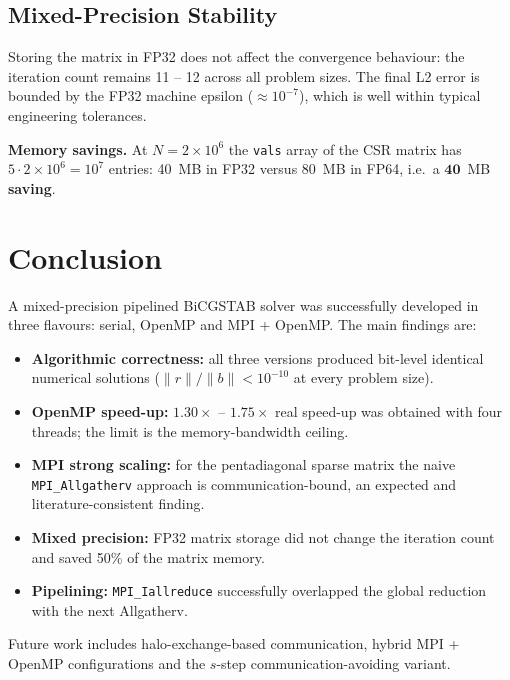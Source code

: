 \documentclass[11pt,a4paper]{article}
\begin{document}
\subsection{Mixed-Precision Stability}

Storing the matrix in FP32 does not affect the convergence behaviour:
the iteration count remains 11 -- 12 across all problem sizes. The
final L2 error is bounded by the FP32 machine epsilon
($\approx 10^{-7}$), which is well within typical engineering
tolerances.

\noindent \textbf{Memory savings.} At $N = 2 \times 10^6$ the
\texttt{vals} array of the CSR matrix has
$5 \cdot 2 \times 10^6 = 10^7$ entries: 40~MB in FP32 versus 80~MB in
FP64, i.e.\ a $\boldsymbol{40}$~MB \textbf{saving}.

\section{Conclusion}

A mixed-precision pipelined BiCGSTAB solver was successfully
developed in three flavours: serial, OpenMP and MPI + OpenMP. The
main findings are:

\begin{itemize}
    \item \textbf{Algorithmic correctness:} all three versions
          produced bit-level identical numerical solutions
          ($\|r\|/\|b\| < 10^{-10}$ at every problem size).
    \item \textbf{OpenMP speed-up:} $1.30\times$ -- $1.75\times$ real
          speed-up was obtained with four threads; the limit is the
          memory-bandwidth ceiling.
    \item \textbf{MPI strong scaling:} for the pentadiagonal sparse
          matrix the naive \texttt{MPI\_Allgatherv} approach is
          communication-bound, an expected and literature-consistent
          finding.
    \item \textbf{Mixed precision:} FP32 matrix storage did not
          change the iteration count and saved 50\% of the matrix
          memory.
    \item \textbf{Pipelining:} \texttt{MPI\_Iallreduce} successfully
          overlapped the global reduction with the next Allgatherv.
\end{itemize}

Future work includes halo-exchange-based communication, hybrid MPI +
OpenMP configurations and the $s$-step communication-avoiding
variant.
\end{document}
